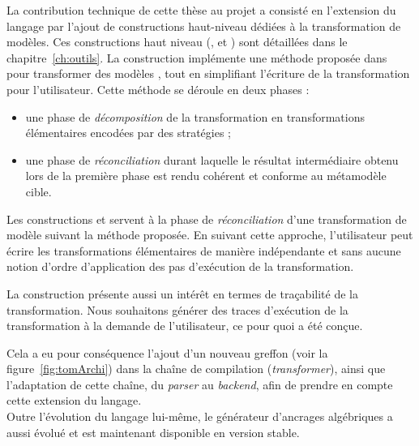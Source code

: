 La contribution technique de cette thèse au projet {\tom} a consisté en
l'extension du langage {\tom} par l'ajout de constructions haut-niveau dédiées
à la transformation de modèles. Ces constructions haut niveau
(,  et ) sont détaillées
dans le chapitre~\ref{ch:outils}. La construction 
implémente une méthode proposée dans~\cite{Bach2012} pour transformer des
modèles {\emf} {\ecore}, tout en simplifiant l'écriture de la transformation
pour l'utilisateur. Cette méthode se déroule en deux phases :
\begin{itemize}
  \item une phase de \emph{décomposition} de la transformation en
    transformations élémentaires encodées par des stratégies {\tom} ;
  \item une phase de \emph{réconciliation} durant laquelle le résultat
    intermédiaire obtenu lors de la première phase est rendu cohérent et
    conforme au métamodèle cible.
\end{itemize}
Les constructions  et  servent à la phase de
\emph{réconciliation} d'une transformation de modèle suivant la méthode
proposée. En suivant cette approche, l'utilisateur peut écrire les
transformations élémentaires de manière indépendante et sans aucune notion
d'ordre d'application des pas d'exécution de la transformation.

La construction  présente aussi un intérêt en termes de
traçabilité de la transformation. Nous souhaitons générer des traces
d'exécution de la transformation à la demande de l'utilisateur, ce pour quoi
 a été conçue.

Cela a eu pour conséquence l'ajout d'un nouveau greffon (voir la
figure~\ref{fig:tomArchi}) dans la chaîne de compilation (\emph{transformer}),
ainsi que l'adaptation de cette chaîne, du \emph{parser} au \emph{backend},
afin de prendre en compte cette extension du langage.\\
Outre l'évolution du langage {\tom} lui-même, le générateur d'ancrages
algébriques {\tomemf} a aussi évolué et est maintenant disponible en
version stable.


